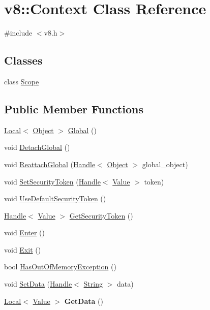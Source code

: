 \hypertarget{classv8_1_1_context}{}\section{v8\+:\+:Context Class Reference}
\label{classv8_1_1_context}


{\ttfamily \#include $<$v8.\+h$>$}

\subsection*{Classes}
\begin{DoxyCompactItemize}
\item 
class \hyperlink{classv8_1_1_context_1_1_scope}{Scope}
\end{DoxyCompactItemize}
\subsection*{Public Member Functions}
\begin{DoxyCompactItemize}
\item 
\hyperlink{classv8_1_1_local}{Local}$<$ \hyperlink{classv8_1_1_object}{Object} $>$ \hyperlink{classv8_1_1_context_af5cd9f97ef6a3307c1c21f80f4b743eb}{Global} ()
\item 
void \hyperlink{classv8_1_1_context_a841c7dd92eb8c57df92a268a164dea97}{Detach\+Global} ()
\item 
void \hyperlink{classv8_1_1_context_a1db9a514d7bb1c055a26359727bd2f6b}{Reattach\+Global} (\hyperlink{classv8_1_1_handle}{Handle}$<$ \hyperlink{classv8_1_1_object}{Object} $>$ global\+\_\+object)
\item 
void \hyperlink{classv8_1_1_context_a288d8549547f6bdf4312f5333f60f24d}{Set\+Security\+Token} (\hyperlink{classv8_1_1_handle}{Handle}$<$ \hyperlink{classv8_1_1_value}{Value} $>$ token)
\item 
void \hyperlink{classv8_1_1_context_aa9e1a14982b64fd51ab87600a287bad2}{Use\+Default\+Security\+Token} ()
\item 
\hyperlink{classv8_1_1_handle}{Handle}$<$ \hyperlink{classv8_1_1_value}{Value} $>$ \hyperlink{classv8_1_1_context_a8e71e658633518ca7718c0f6e938c6a9}{Get\+Security\+Token} ()
\item 
void \hyperlink{classv8_1_1_context_a6995c49d9897eb49053f07874b825133}{Enter} ()
\item 
void \hyperlink{classv8_1_1_context_a2db09d4fefb26023a40d88972a4c1599}{Exit} ()
\item 
bool \hyperlink{classv8_1_1_context_aadec400a5da1e79e58a8770fd706b9a0}{Has\+Out\+Of\+Memory\+Exception} ()
\item 
void \hyperlink{classv8_1_1_context_aaf39e5adc0ef4081d591952d17c6ada5}{Set\+Data} (\hyperlink{classv8_1_1_handle}{Handle}$<$ \hyperlink{classv8_1_1_string}{String} $>$ data)
\item 
\hypertarget{classv8_1_1_context_a0c5edad65549bf11edce29bfa3bc3aef}{}\hyperlink{classv8_1_1_local}{Local}$<$ \hyperlink{classv8_1_1_value}{Value} $>$ {\bfseries Get\+Data} ()\label{classv8_1_1_context_a0c5edad65549bf11edce29bfa3bc3aef}

\end{DoxyCompactItemize}
